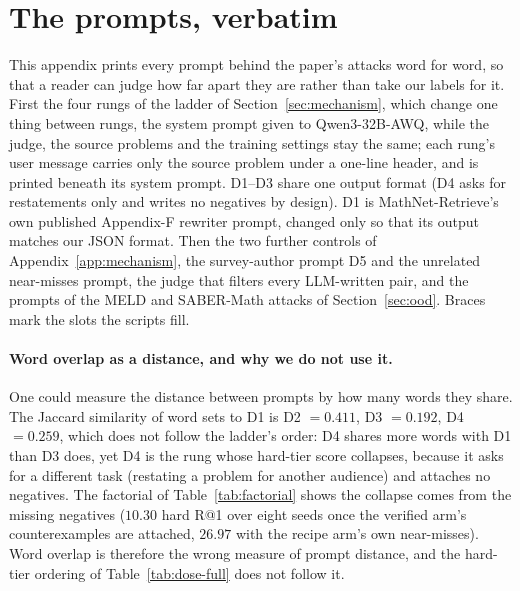 \section{The prompts, verbatim}
\label{app:prompts}

This appendix prints every prompt behind the paper's attacks word for word, so that a reader can judge how far apart they are rather than take our labels for it. First the four rungs of the ladder of Section~\ref{sec:mechanism}, which change one thing between rungs, the system prompt given to Qwen3-32B-AWQ, while the judge, the source problems and the training settings stay the same; each rung's user message carries only the source problem under a one-line header, and is printed beneath its system prompt. D1--D3 share one output format (D4 asks for restatements only and writes no negatives by design). D1 is MathNet-Retrieve's own published Appendix-F rewriter prompt, changed only so that its output matches our JSON format. Then the two further controls of Appendix~\ref{app:mechanism}, the survey-author prompt D5 and the unrelated near-misses prompt, the judge that filters every LLM-written pair, and the prompts of the MELD and SABER-Math attacks of Section~\ref{sec:ood}. Braces mark the slots the scripts fill.

\paragraph{Word overlap as a distance, and why we do not use it.}
One could measure the distance between prompts by how many words they share. The Jaccard similarity of word sets to D1 is D2 $= 0.411$, D3 $= 0.192$, D4 $= 0.259$, which does not follow the ladder's order: D4 shares more words with D1 than D3 does, yet D4 is the rung whose hard-tier score collapses, because it asks for a different task (restating a problem for another audience) and attaches no negatives. The factorial of Table~\ref{tab:factorial} shows the collapse comes from the missing negatives ($10.30$ hard R@1 over eight seeds once the verified arm's counterexamples are attached, $26.97$ with the recipe arm's own near-misses). Word overlap is therefore the wrong measure of prompt distance, and the hard-tier ordering of Table~\ref{tab:dose-full} does not follow it.

